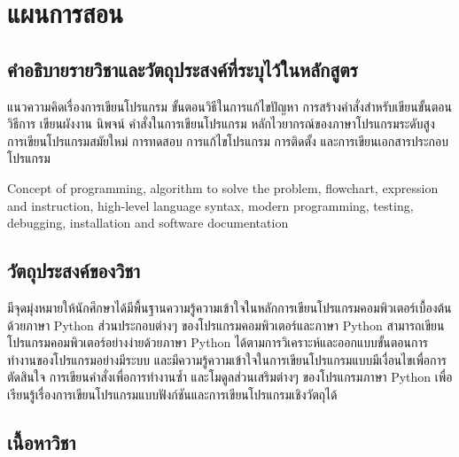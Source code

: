 \chapter{แผนการสอน}
\section{คำอธิบายรายวิชาและวัตถุประสงค์ที่ระบุไว้ในหลักสูตร}

แนวความคิดเรื่องการเขียนโปรแกรม ขั้นตอนวิธีในการแก้ไขปัญหา การสร้างคำสั่งสำหรับเขียนขั้นตอนวิธีการ เขียนผังงาน นิพจน์ คำสั่งในการเขียนโปรแกรม หลักไวยากรณ์ของภาษาโปรแกรมระดับสูง การเขียนโปรแกรมสมัยใหม่ การทดสอบ การแก้ไขโปรแกรม การติดตั้ง และการเขียนเอกสารประกอบโปรแกรม

Concept of programming, algorithm to solve the problem, flowchart, expression and instruction, high-level language syntax, modern programming, testing, debugging, installation and software documentation

\section{วัตถุประสงค์ของวิชา}

มีจุดมุ่งหมายให้นักศึกษาได้มีพื้นฐานความรู้ความเข้าใจในหลักการเขียนโปรแกรมคอมพิวเตอร์เบื้องต้นด้วยภาษา Python ส่วนประกอบต่างๆ ของโปรแกรมคอมพิวเตอร์และภาษา Python สามารถเขียนโปรแกรมคอมพิวเตอร์อย่างง่ายด้วยภาษา Python ได้ตามการวิเคราะห์และออกแบบขั้นตอนการทำงานของโปรแกรมอย่างมีระบบ และมีความรู้ความเข้าใจในการเขียนโปรแกรมแบบมีเงื่อนไขเพื่อการตัดสินใจ การเขียนคำสั่งเพื่อการทำงานซ้ำ และโมดูลส่วนเสริมต่างๆ ของโปรแกรมภาษา Python เพื่อเรียนรู้เรื่องการเขียนโปรแกรมแบบฟังก์ชันและการเขียนโปรแกรมเชิงวัตถุได้

\section{เนื้อหาวิชา}


\newcommand{\lesson}[3]{
\subsection{สัปดาห์ที่ {#1}}
\begin{tcolorbox}[breakable,enhanced,fonttitle=\bfseries,title=สัปดาห์ที่ {#1}]
\begin{description}

\item[ผู้สอน] จันทวรรณ ปิยะวัฒน์
\item[จำนวนชั่วโมงบรรยาย] 2
\item[จำนวนชั่วโมงปฎิบัติ] 2
\item[หัวข้อ/รายละเอียด] \hfill \\
{#2}
\item[กิจกรรมการเรียนการสอน/สื่อที่ใช้] \hfill
\begin{itemize}[leftmargin=0pt]
{#3}
\end{itemize}

\end{description}
\end{tcolorbox}
}

